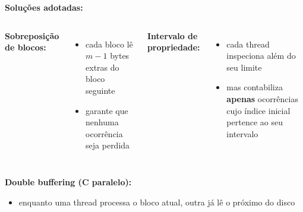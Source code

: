 \documentclass{beamer}
\begin{document}
\begin{frame}


\textbf{Soluções adotadas:}
\begin{columns}
    \textbf{Sobreposição de blocos:}
    \begin{itemize}
        \item cada bloco lê $m-1$ bytes extras do bloco seguinte
        \item garante que nenhuma ocorrência seja perdida
    \end{itemize}

    \textbf{Intervalo de propriedade:}
    \begin{itemize}
        \item cada thread inspeciona além do seu limite
        \item mas contabiliza \textbf{apenas} ocorrências cujo índice inicial pertence ao seu intervalo
    \end{itemize}
\end{columns}

\vspace{0.2cm}

\textbf{Double buffering (C paralelo):}
\begin{itemize}
    \item enquanto uma thread processa o bloco atual, outra já lê o próximo do disco
    
\end{itemize}


\end{frame}
\end{document}
